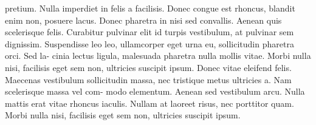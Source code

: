 \documentclass[11pt,a4paper,twocolumn]{article}
\begin{document}
{  pretium. Nulla imperdiet in felis a facilisis. Donec congue est
  rhoncus, blandit enim non, posuere lacus. Donec pharetra in nisi sed
  convallis.  Aenean quis scelerisque felis. Curabitur pulvinar elit
  id turpis vestibulum, at pulvinar sem dignissim. Suspendisse leo
  leo, ullamcorper eget urna eu, sollicitudin pharetra orci. Sed la-
  cinia lectus ligula, malesuada pharetra nulla mollis vitae. Morbi
  nulla nisi, facilisis eget sem non, ultricies suscipit ipsum. Donec
  vitae eleifend felis. Maecenas vestibulum sollicitudin massa, nec
  tristique metus ultricies a. Nam scelerisque massa vel com- modo
  elementum. Aenean sed vestibulum arcu. Nulla mattis erat vitae
  rhoncus iaculis. Nullam at laoreet risus, nec porttitor quam. Morbi
  nulla nisi, facilisis eget sem non, ultricies suscipit ipsum.}
\end{document}
